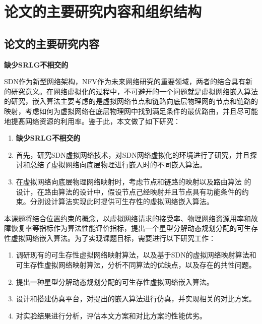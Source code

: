 \section{论文的主要研究内容和组织结构}
\subsection{论文的主要研究内容}
\textbf{缺少SRLG不相交的}

SDN作为新型网络架构，NFV作为未来网络研究的重要领域，两者的结合具有新的研究意义。在网络虚拟化的过程中，不可避开的一个问题就是虚拟网络嵌入算法的研究，嵌入算法主要考虑的是虚拟网络节点和链路向底层物理网的节点和链路的映射，考虑如何为虚拟网络在底层物理网中找到满足条件的最优路由，并且尽可能地提髙网络资源的利用率。鉴于此，本文做了如下研究：
\begin{enumerate}
  \item \textbf{缺少SRLG不相交的}
  \item 首先，研究SDN虚拟网络技术，对SDN网络虚拟化的环境进行了研究，并且探讨和总结了虚拟网络向底层物理进行嵌入时的不同嵌入算法。
  \item 在虚拟网络向底层物理网络映射时，考虑节点和链路的映射以及路由算法 的设计，在路由算法的设计中，假设节点己经映射并且节点具有功能条件的约束。分别设计算法实现此时提供可生存性的虚拟网络嵌入算法。
\end{enumerate}


本课题将结合位置约束的概念，以虚拟网络请求的接受率、物理网络资源用率和故障恢复率等指标作为算法性能评价指标，提出一个星型分解动态规划分配的可生存性虚拟网络嵌入算法。为了实现课题目标，需要进行以下研究工作：
\begin{enumerate}
  \item 调研现有的可生存性虚拟网络映射算法，以及基于SDN的虚拟网络映射算法和可生存性虚拟网络映射算法，分析不同算法的优缺点，以及存在的共性问题。
  \item 提出一种星型分解动态规划分配的可生存性虚拟网络嵌入算法。
  \item 设计和搭建仿真平台，对提出的嵌入算法进行仿真，并实现相关的对比方案。
  \item 对实验结果进行分析，评估本文方案和对比方案的性能优劣。
\end{enumerate}


